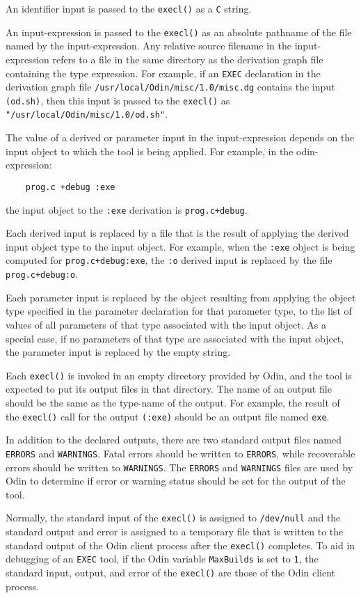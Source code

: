 \documentclass[hidelinks]{report}
\newcommand{\ex}{\tt}   %
\begin{document}
An identifier input is passed to the {\ex execl()} as a {\ex C} string.

An input-expression is passed to the {\ex execl()} as an absolute pathname
of the file named by the input-expression.
Any relative source filename in the input-expression refers to a file
in the same directory as the derivation graph file containing the type
expression.  For example, if an {\ex EXEC} declaration in the
derivation graph file {\ex /usr/local/Odin/misc/1.0/misc.dg} contains
the input {\ex (od.sh)},
then this input is passed to the {\ex execl()} as
{\ex "/usr/local/Odin/misc/1.0/od.sh"}.

The value of a derived or parameter input in the input-expression
depends on the input object to which the tool is being applied.
For example, in the odin-expression:
\begin{verbatim}
    prog.c +debug :exe
\end{verbatim}
the input object to the {\ex :exe} derivation is {\ex prog.c+debug}.

Each derived input is replaced by a file that is
the result of applying the derived input object type to the input object.
For example, when the {\ex :exe} object is
being computed for {\ex prog.c+debug:exe},
the {\ex :o} derived input is replaced by the file
{\ex prog.c+debug:o}.

Each parameter input is replaced by
the object resulting from applying the object type
specified in the parameter declaration for that parameter type,
to the list of values of all parameters
of that type associated with the input object.
As a special case,
if no parameters of that type are associated with the input object,
the parameter input is replaced by the empty string.

Each {\ex execl()} is invoked in an empty directory provided by Odin,
and the tool is expected to put its output files in that directory.
The name of an output file should be the same as the type-name of
the output.  For example, the result of the {\ex execl()} call
for the output {\ex (:exe)} should be an output file named {\ex exe}.

In addition to the declared outputs,
there are two standard output files named {\ex ERRORS} and {\ex WARNINGS}.
Fatal errors should be written to {\ex ERRORS},
while recoverable errors should be written to {\ex WARNINGS}.
The {\ex ERRORS} and {\ex WARNINGS} files
are used by Odin to determine if error or warning status
should be set for the output of the tool.

Normally, the standard input of the {\ex execl()} is assigned to
{\ex /dev/null} and the standard output and error is assigned to
a temporary file that is written to the standard output of the
Odin client process after the {\ex execl()} completes.
To aid in debugging of an {\ex EXEC} tool,
if the Odin variable {\ex MaxBuilds} is set to {\ex 1},
the standard input, output, and error of the {\ex execl()}
are those of the Odin client process.
\end{document}
